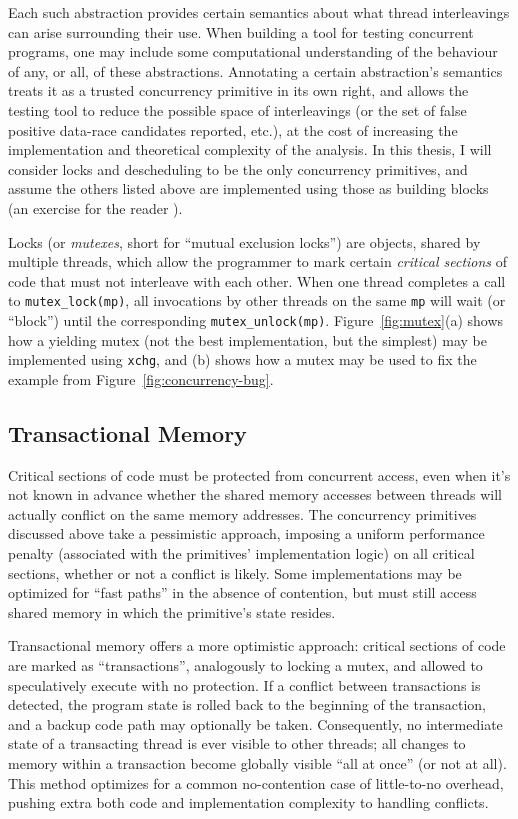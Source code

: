 Each such abstraction provides certain semantics about what thread interleavings can arise surrounding their use.
When building a tool for testing concurrent programs,
one may include some computational understanding of the behaviour of any, or all, of these abstractions.
Annotating a certain abstraction's semantics treats it as a trusted concurrency primitive in its own right,
and allows the testing tool to reduce the possible space of interleavings (or the set of false positive data-race candidates reported, etc.),
at the cost of increasing the implementation and theoretical complexity of the analysis.
In this thesis, I will consider locks and descheduling to be the only concurrency primitives,
and assume the others listed above are implemented using those as building blocks (an exercise for the reader \cite{thrlib}).

Locks (or {\em mutexes}, short for ``mutual exclusion locks'') are objects, shared by multiple threads, which allow the programmer to mark certain {\em critical sections} of code that must not interleave with each other.
When one thread completes a call to {\tt mutex\_lock(mp)}, all invocations by other threads on the same {\tt mp} will wait (or ``block'') until the corresponding {\tt mutex\_unlock(mp)}.
Figure~\ref{fig:mutex}(a) shows how a yielding mutex (not the best implementation, but the simplest) may be implemented using {\tt xchg},
and (b) shows how a mutex may be used to fix the example from Figure~\ref{fig:concurrency-bug}.


\subsection{Transactional Memory}

Critical sections of code must be protected from concurrent access, even when it's not known in advance whether the shared memory accesses between threads will actually conflict on the same memory addresses.
The concurrency primitives discussed above take a pessimistic approach, imposing a uniform performance penalty (associated with the primitives' implementation logic) on all critical sections, whether or not a conflict is likely.
Some implementations may be optimized for ``fast paths'' in the absence of contention, but must still access shared memory in which the primitive's state resides.

Transactional memory \cite{transactional-memory} offers a more optimistic approach: critical sections of code are marked as ``transactions'', analogously to locking a mutex, and allowed to speculatively execute with no protection.
If a conflict between transactions is detected, the program state is rolled back to the beginning of the transaction, and a backup code path may optionally be taken.
Consequently, no intermediate state of a transacting thread is ever visible to other threads; all changes to memory within a transaction become globally visible ``all at once'' (or not at all).
This method optimizes for a common no-contention case of little-to-no overhead, pushing extra both code and implementation complexity to handling conflicts.

